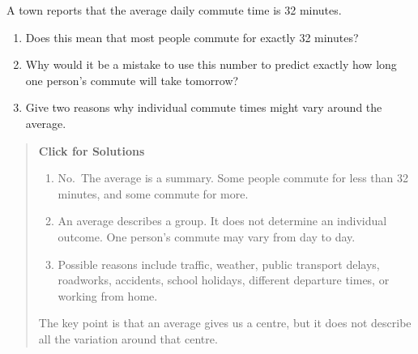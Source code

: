 \documentclass[
  letterpaper,
  DIV=11,
  numbers=noendperiod]{scrreprt}
\begin{document}
\begin{tcolorbox}[enhanced jigsaw, arc=.35mm, bottomrule=.15mm, bottomtitle=1mm, breakable, colback=white, colbacktitle=quarto-callout-note-color!10!white, colframe=quarto-callout-note-color-frame, coltitle=black, left=2mm, leftrule=.75mm, opacityback=0, opacitybacktitle=0.6, rightrule=.15mm, title=\textcolor{quarto-callout-note-color}{\faInfo}\hspace{0.5em}{Question 9}, titlerule=0mm, toprule=.15mm, toptitle=1mm]

A town reports that the average daily commute time is 32 minutes.

\begin{enumerate}
\def\labelenumi{\alph{enumi}.}
\item
  Does this mean that most people commute for exactly 32 minutes?
\item
  Why would it be a mistake to use this number to predict exactly how
  long one person's commute will take tomorrow?
\item
  Give two reasons why individual commute times might vary around the
  average.
\end{enumerate}

\begin{quote}
\textbf{Click for Solutions}

\begin{enumerate}
\def\labelenumi{\alph{enumi}.}
\item
  No.~The average is a summary. Some people commute for less than 32
  minutes, and some commute for more.
\item
  An average describes a group. It does not determine an individual
  outcome. One person's commute may vary from day to day.
\item
  Possible reasons include traffic, weather, public transport delays,
  roadworks, accidents, school holidays, different departure times, or
  working from home.
\end{enumerate}

The key point is that an average gives us a centre, but it does not
describe all the variation around that centre.
\end{quote}

\end{tcolorbox}
\end{document}
